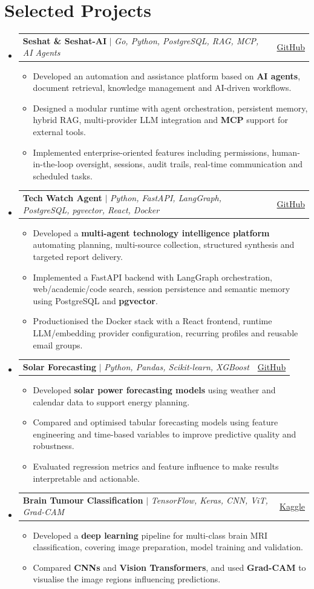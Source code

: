\documentclass[a4paper,11pt]{article}
\makeatletter
\newcommand{\resumeItem}[1]{\item\small{{#1 \vspace{-1.5pt}}}}
\newcommand{\resumeProjectHeading}[2]{\Needspace{6\baselineskip}\vspace{2pt}\item
  \begin{tabular*}{0.97\textwidth}{l@{\extracolsep{\fill}}r}\small#1 & #2 \\
  \end{tabular*}\vspace{-3pt}}
\newcommand{\resumeSubHeadingListStart}{\begin{itemize}[leftmargin=0.15in,label={}]}
\newcommand{\resumeSubHeadingListEnd}{\end{itemize}}
\newcommand{\resumeItemListStart}{\begin{itemize}[leftmargin=0.15in,label={\small\textbullet},itemsep=1.5pt,parsep=0pt,topsep=2pt,partopsep=0pt]}
\newcommand{\resumeItemListEnd}{\end{itemize}\vspace{-1pt}}
\makeatother
\begin{document}
\section{Selected Projects}
\resumeSubHeadingListStart
\resumeProjectHeading{\textbf{Seshat \& Seshat-AI} $|$ \emph{Go, Python, PostgreSQL, RAG, MCP, AI Agents}}{\href{https://github.com/EngineerProjects/seshat}{GitHub}}
\resumeItemListStart
  \resumeItem{Developed an automation and assistance platform based on \textbf{AI agents}, document retrieval, knowledge management and AI-driven workflows.}
  \resumeItem{Designed a modular runtime with agent orchestration, persistent memory, hybrid RAG, multi-provider LLM integration and \textbf{MCP} support for external tools.}
  \resumeItem{Implemented enterprise-oriented features including permissions, human-in-the-loop oversight, sessions, audit trails, real-time communication and scheduled tasks.}
\resumeItemListEnd
\resumeProjectHeading{\textbf{Tech Watch Agent} $|$ \emph{Python, FastAPI, LangGraph, PostgreSQL, pgvector, React, Docker}}{\href{https://github.com/EngineerProjects/tech-watch-agent}{GitHub}}
\resumeItemListStart
  \resumeItem{Developed a \textbf{multi-agent technology intelligence platform} automating planning, multi-source collection, structured synthesis and targeted report delivery.}
  \resumeItem{Implemented a FastAPI backend with LangGraph orchestration, web/academic/code search, session persistence and semantic memory using PostgreSQL and \textbf{pgvector}.}
  \resumeItem{Productionised the Docker stack with a React frontend, runtime LLM/embedding provider configuration, recurring profiles and reusable email groups.}
\resumeItemListEnd
\resumeProjectHeading{\textbf{Solar Forecasting} $|$ \emph{Python, Pandas, Scikit-learn, XGBoost}}{\href{https://github.com/EngineerProjects/solar-forecasting}{GitHub}}
\resumeItemListStart
  \resumeItem{Developed \textbf{solar power forecasting models} using weather and calendar data to support energy planning.}
  \resumeItem{Compared and optimised tabular forecasting models using feature engineering and time-based variables to improve predictive quality and robustness.}
  \resumeItem{Evaluated regression metrics and feature influence to make results interpretable and actionable.}
\resumeItemListEnd
\resumeProjectHeading{\textbf{Brain Tumour Classification} $|$ \emph{TensorFlow, Keras, CNN, ViT, Grad-CAM}}{\href{https://www.kaggle.com/code/kpoviesistphane/ia-sant-project}{Kaggle}}
\resumeItemListStart
  \resumeItem{Developed a \textbf{deep learning} pipeline for multi-class brain MRI classification, covering image preparation, model training and validation.}
  \resumeItem{Compared \textbf{CNNs} and \textbf{Vision Transformers}, and used \textbf{Grad-CAM} to visualise the image regions influencing predictions.}
\resumeItemListEnd
\resumeSubHeadingListEnd
\end{document}
